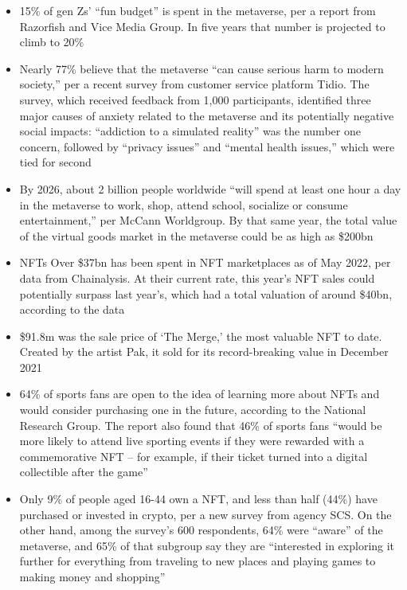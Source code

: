 {\begin{itemize}
\item 15\% of gen Zs’ “fun budget” is spent in the metaverse, per a report from Razorfish and Vice Media Group. In five years that number is projected to climb to 20\%
\item Nearly 77\% believe that the metaverse “can cause serious harm to modern society,” per a recent survey from customer service platform Tidio. The survey, which received feedback from 1,000 participants, identified three major causes of anxiety related to the metaverse and its potentially negative social impacts: “addiction to a simulated reality” was the number one concern, followed by “privacy issues” and “mental health issues,” which were tied for second
\item By 2026, about 2 billion people worldwide “will spend at least one hour a day in the metaverse to work, shop, attend school, socialize or consume entertainment,” per McCann Worldgroup. By that same year, the total value of the virtual goods market in the metaverse could be as high as \$200bn
\item NFTs
Over \$37bn has been spent in NFT marketplaces as of May 2022, per data from Chainalysis. At their current rate, this year’s NFT sales could potentially surpass last year’s, which had a total valuation of around \$40bn, according to the data
\item \$91.8m was the sale price of ‘The Merge,’ the most valuable NFT to date. Created by the artist Pak, it sold for its record-breaking value in December 2021
\item 64\% of sports fans are open to the idea of learning more about NFTs and would consider purchasing one in the future, according to the National Research Group. The report also found that 46\% of sports fans “would be more likely to attend live sporting events if they were rewarded with a commemorative NFT – for example, if their ticket turned into a digital collectible after the game”
\item Only 9\% of people aged 16-44 own a NFT, and less than half (44\%) have purchased or invested in crypto, per a new survey from agency SCS. On the other hand, among the survey’s 600 respondents, 64\% were “aware” of the metaverse, and 65\% of that subgroup say they are “interested in exploring it further for everything from traveling to new places and playing games to making money and shopping”
\end{itemize}}
